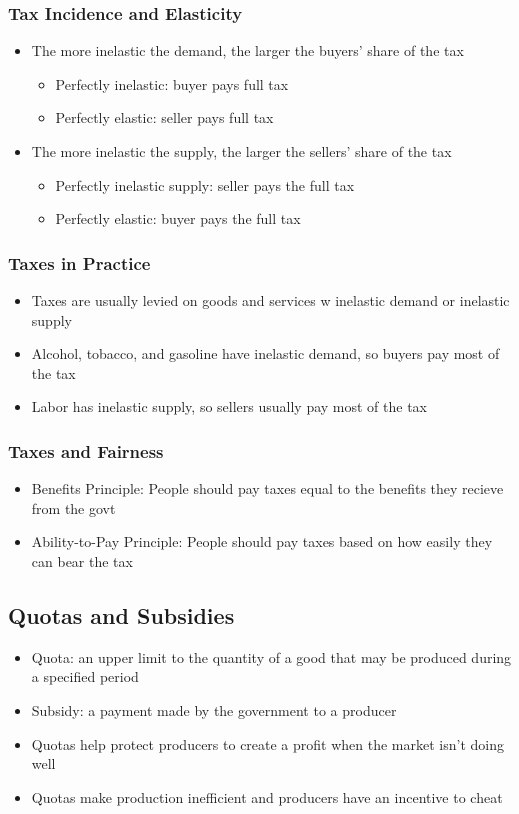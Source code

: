 \documentclass[11pt]{article}
\begin{document}
\subsubsection{Tax Incidence and Elasticity}
\label{sec:org7390a71}
\begin{itemize}
\item The more inelastic the demand, the larger the buyers' share of the tax
\begin{itemize}
\item Perfectly inelastic: buyer pays full tax
\item Perfectly elastic: seller pays full tax
\end{itemize}
\item The more inelastic the supply, the larger the sellers' share of the tax
\begin{itemize}
\item Perfectly inelastic supply: seller pays the full tax
\item Perfectly elastic: buyer pays the full tax
\end{itemize}
\end{itemize}
\subsubsection{Taxes in Practice}
\label{sec:org2c2b286}
\begin{itemize}
\item Taxes are usually levied on goods and services w inelastic demand or inelastic supply
\item Alcohol, tobacco, and gasoline have inelastic demand, so buyers pay most of the tax
\item Labor has inelastic supply, so sellers usually pay most of the tax
\end{itemize}
\subsubsection{Taxes and Fairness}
\label{sec:org57d7573}
\begin{itemize}
\item Benefits Principle: People should pay taxes equal to the benefits they recieve from the govt
\item Ability-to-Pay Principle: People should pay taxes based on how easily they can bear the tax
\end{itemize}
\subsection{Quotas and Subsidies}
\label{sec:orgd513fd9}
\begin{itemize}
\item Quota: an upper limit to the quantity of a good that may be produced during a specified period
\item Subsidy: a payment made by the government to a producer
\item Quotas help protect producers to create a profit when the market isn't doing well
\item Quotas make production inefficient and producers have an incentive to cheat
\end{itemize}
\end{document}
